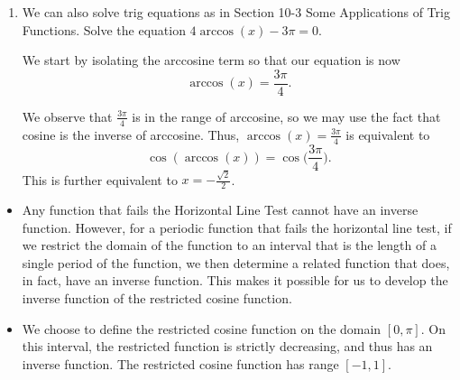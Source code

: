 \documentclass{ximera}
\begin{document}
\begin{example}
\begin{enumerate}
\begin{explanation}
\end{explanation}

\item We can also solve trig equations as in Section 10-3 Some Applications of Trig Functions. Solve the equation $4\arccos(x)-3\pi=0$.

\begin{explanation}
We start by isolating the arccosine term so that our equation is now
$$\arccos(x) = \frac{3\pi}{4}.$$

We observe that $\frac{3\pi}{4}$ is in the range of arccosine, so we may use the fact that cosine is the inverse of arccosine. Thus, $\arccos(x) = \frac{3\pi}{4}$ is equivalent to 
$$\cos(\arccos(x)) = \cos\bigg(\frac{3\pi}{4}\bigg).$$
%
This is further equivalent to $x = -\frac{\sqrt{2}}{2}$.
\end{explanation}
%
\end{enumerate}
\end{example}



%


\begin{summary}
  \begin{itemize}
\item Any function that fails the Horizontal Line Test cannot have an inverse function.  However, for a periodic function that fails the horizontal line test, if we restrict the domain of the function to an interval that is the length of a single period of the function, we then determine a related function that does, in fact, have an inverse function.  This makes it possible for us to develop the inverse function of the restricted cosine function.
\item We choose to define the restricted cosine function on the domain $[0,\pi]$. On this interval, the restricted function is strictly decreasing, and thus has an inverse function.  The restricted cosine function has range $[-1,1]$. 
  \end{itemize}
\end{summary}
\end{document}
